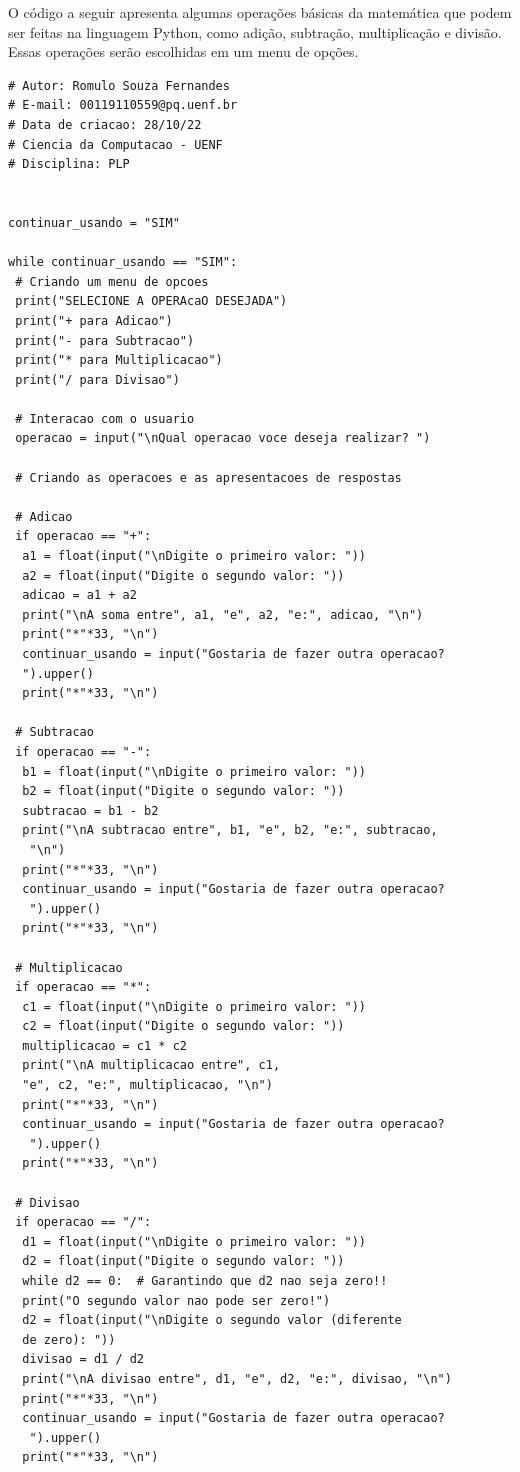     O código a seguir apresenta algumas operações básicas da matemática que podem ser feitas na linguagem Python, como adição, subtração, multiplicação e divisão. Essas operações serão escolhidas em um menu de opções. 
	\begin{lstlisting}
# Autor: Romulo Souza Fernandes
# E-mail: 00119110559@pq.uenf.br
# Data de criacao: 28/10/22
# Ciencia da Computacao - UENF
# Disciplina: PLP
		
		
continuar_usando = "SIM"
		
while continuar_usando == "SIM":
 # Criando um menu de opcoes
 print("SELECIONE A OPERAcaO DESEJADA")
 print("+ para Adicao")
 print("- para Subtracao")
 print("* para Multiplicacao")
 print("/ para Divisao")
		
 # Interacao com o usuario
 operacao = input("\nQual operacao voce deseja realizar? ")
		
 # Criando as operacoes e as apresentacoes de respostas
		
 # Adicao
 if operacao == "+":
  a1 = float(input("\nDigite o primeiro valor: "))
  a2 = float(input("Digite o segundo valor: "))
  adicao = a1 + a2
  print("\nA soma entre", a1, "e", a2, "e:", adicao, "\n")
  print("*"*33, "\n")
  continuar_usando = input("Gostaria de fazer outra operacao? 
  ").upper()
  print("*"*33, "\n")
		
 # Subtracao
 if operacao == "-":
  b1 = float(input("\nDigite o primeiro valor: "))
  b2 = float(input("Digite o segundo valor: "))
  subtracao = b1 - b2
  print("\nA subtracao entre", b1, "e", b2, "e:", subtracao,
   "\n")
  print("*"*33, "\n")
  continuar_usando = input("Gostaria de fazer outra operacao?
   ").upper()
  print("*"*33, "\n")
		
 # Multiplicacao
 if operacao == "*":
  c1 = float(input("\nDigite o primeiro valor: "))
  c2 = float(input("Digite o segundo valor: "))
  multiplicacao = c1 * c2
  print("\nA multiplicacao entre", c1,
  "e", c2, "e:", multiplicacao, "\n")
  print("*"*33, "\n")
  continuar_usando = input("Gostaria de fazer outra operacao?
   ").upper()
  print("*"*33, "\n")
		
 # Divisao
 if operacao == "/":
  d1 = float(input("\nDigite o primeiro valor: "))
  d2 = float(input("Digite o segundo valor: "))
  while d2 == 0:  # Garantindo que d2 nao seja zero!!
  print("O segundo valor nao pode ser zero!")
  d2 = float(input("\nDigite o segundo valor (diferente 
  de zero): "))
  divisao = d1 / d2
  print("\nA divisao entre", d1, "e", d2, "e:", divisao, "\n")
  print("*"*33, "\n")
  continuar_usando = input("Gostaria de fazer outra operacao?
   ").upper()
  print("*"*33, "\n")
	\end{lstlisting}

